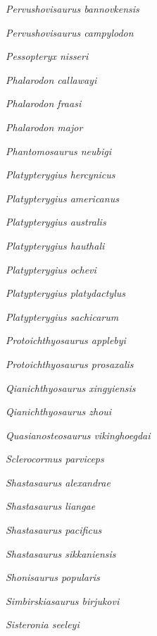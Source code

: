 \emph{Pervushovisaurus bannovkensis}~

\emph{Pervushovisaurus campylodon}~

\emph{Pessopteryx nisseri}~

\emph{Phalarodon callawayi}~

\emph{Phalarodon fraasi}~

\emph{Phalarodon major}~

\emph{Phantomosaurus neubigi}~

\emph{Platypterygius  hercynicus}~

\emph{Platypterygius americanus}~

\emph{Platypterygius australis}~

\emph{Platypterygius hauthali}~

\emph{Platypterygius ochevi}~

\emph{Platypterygius platydactylus}~

\emph{Platypterygius sachicarum}~

\emph{Protoichthyosaurus applebyi}~

\emph{Protoichthyosaurus prosaxalis}~

\emph{Qianichthyosaurus xingyiensis}~

\emph{Qianichthyosaurus zhoui}~

\emph{Quasianosteosaurus vikinghoegdai}~

\emph{Sclerocormus parviceps}~

\emph{Shastasaurus alexandrae}~

\emph{Shastasaurus liangae}~

\emph{Shastasaurus pacificus}~

\emph{Shastasaurus sikkaniensis}~

\emph{Shonisaurus popularis}~

\emph{Simbirskiasaurus birjukovi}~

\emph{Sisteronia seeleyi}~

